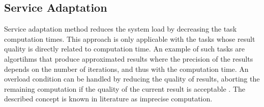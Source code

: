 \subsection{Service Adaptation}
Service adaptation method reduces the system load by decreasing the task computation times. 
This approach is only applicable with the tasks whose result quality is directly related to computation time.
An example of such tasks are algortihms that produce approximated results where the precision of the results depends on the number of iterations, and thus with the computation time. 
An overload condition can be handled by reducing the quality of results, aborting the remaining computation if the quality of the current result is acceptable \cite{shih1989scheduling}. 
The described concept is known in literature as imprecise computation. 




